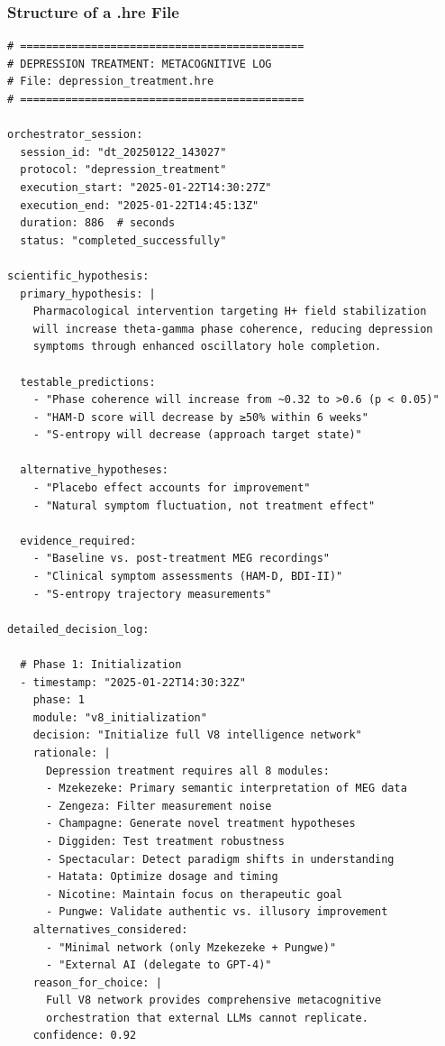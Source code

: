 \subsubsection{Structure of a .hre File}

\begin{verbatim}
# ============================================
# DEPRESSION TREATMENT: METACOGNITIVE LOG
# File: depression_treatment.hre
# ============================================

orchestrator_session:
  session_id: "dt_20250122_143027"
  protocol: "depression_treatment"
  execution_start: "2025-01-22T14:30:27Z"
  execution_end: "2025-01-22T14:45:13Z"
  duration: 886  # seconds
  status: "completed_successfully"

scientific_hypothesis:
  primary_hypothesis: |
    Pharmacological intervention targeting H+ field stabilization 
    will increase theta-gamma phase coherence, reducing depression 
    symptoms through enhanced oscillatory hole completion.
  
  testable_predictions:
    - "Phase coherence will increase from ~0.32 to >0.6 (p < 0.05)"
    - "HAM-D score will decrease by ≥50% within 6 weeks"
    - "S-entropy will decrease (approach target state)"
  
  alternative_hypotheses:
    - "Placebo effect accounts for improvement"
    - "Natural symptom fluctuation, not treatment effect"
  
  evidence_required:
    - "Baseline vs. post-treatment MEG recordings"
    - "Clinical symptom assessments (HAM-D, BDI-II)"
    - "S-entropy trajectory measurements"

detailed_decision_log:
  
  # Phase 1: Initialization
  - timestamp: "2025-01-22T14:30:32Z"
    phase: 1
    module: "v8_initialization"
    decision: "Initialize full V8 intelligence network"
    rationale: |
      Depression treatment requires all 8 modules:
      - Mzekezeke: Primary semantic interpretation of MEG data
      - Zengeza: Filter measurement noise
      - Champagne: Generate novel treatment hypotheses
      - Diggiden: Test treatment robustness
      - Spectacular: Detect paradigm shifts in understanding
      - Hatata: Optimize dosage and timing
      - Nicotine: Maintain focus on therapeutic goal
      - Pungwe: Validate authentic vs. illusory improvement
    alternatives_considered:
      - "Minimal network (only Mzekezeke + Pungwe)"
      - "External AI (delegate to GPT-4)"
    reason_for_choice: |
      Full V8 network provides comprehensive metacognitive 
      orchestration that external LLMs cannot replicate.
    confidence: 0.92
  

\end{verbatim}
